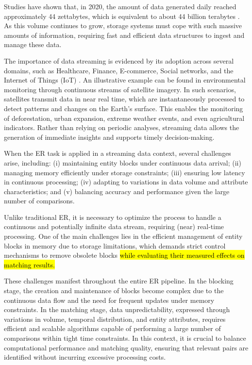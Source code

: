 \documentclass{ieeeaccess}
\begin{document}
Studies have shown that, in 2020, the amount of data generated daily reached approximately 44 zettabytes, which is equivalent to about 44 billion terabytes \cite{Berisha2022}. As this volume continues to grow, storage systems must cope with such massive amounts of information, requiring fast and efficient data structures to ingest and manage these data.

The importance of data streaming is evidenced by its adoption across several domains, such as Healthcare, Finance, E-commerce, Social networks, and the Internet of Things (IoT) \cite{DHARAVATH201593, gentile2017entity, 10.1145/3448016.3457238, doi:10.1504/IJWGS.2017.085167, Sergey2012JointLU}. An illustrative example can be found in environmental monitoring through continuous streams of satellite imagery. In such scenarios, satellites transmit data in near real time, which are instantaneously processed to detect patterns and changes on the Earth’s surface. This enables the monitoring of deforestation, urban expansion, extreme weather events, and even agricultural indicators. Rather than relying on periodic analyses, streaming data allows the generation of immediate insights and supports timely decision-making.

When the ER task is applied in a streaming data context, several challenges arise, including: (i) maintaining entity blocks under continuous data arrival; (ii) managing memory efficiently under storage constraints; (iii) ensuring low latency in continuous processing;  (iv) adapting to variations in data volume and attribute characteristics; and (v) balancing accuracy and performance given the large number of comparisons.

Unlike traditional ER, it is necessary to optimize the process to handle a continuous and potentially infinite data stream, requiring (near) real-time processing. One of the main challenges lies in the efficient management of entity blocks in memory due to storage limitations, which demands strict control mechanisms to remove obsolete blocks \hl{while evaluating their measured effects on matching results.}

These challenges manifest throughout the entire ER pipeline. In the blocking stage, the creation and maintenance of blocks become complex due to the continuous data flow and the need for frequent updates under memory constraints. In the matching stage, data unpredictability, expressed through variations in volume, temporal distribution, and entity attributes, requires efficient and scalable algorithms capable of performing a large number of comparisons within tight time constraints. In this context, it is crucial to balance computational performance and matching quality, ensuring that relevant pairs are identified without incurring excessive processing costs.
\end{document}
